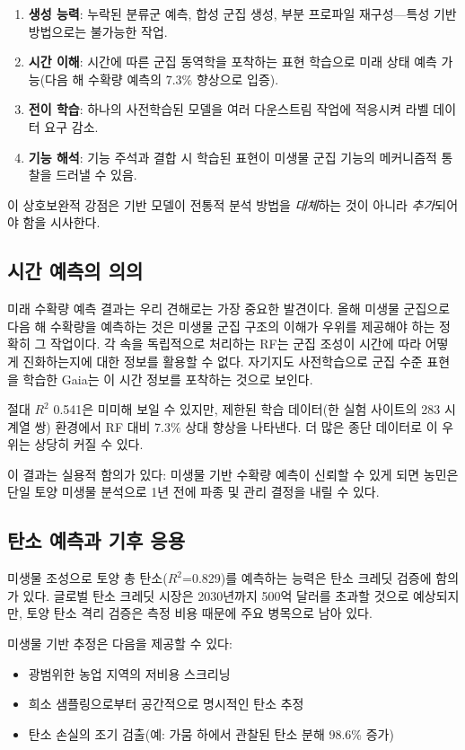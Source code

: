 \documentclass[11pt,a4paper]{article}
\begin{document}
\begin{enumerate}[leftmargin=1.5em]
    \item \textbf{생성 능력}: 누락된 분류군 예측, 합성 군집 생성, 부분 프로파일 재구성---특성 기반 방법으로는 불가능한 작업.
    \item \textbf{시간 이해}: 시간에 따른 군집 동역학을 포착하는 표현 학습으로 미래 상태 예측 가능(다음 해 수확량 예측의 7.3\% 향상으로 입증).
    \item \textbf{전이 학습}: 하나의 사전학습된 모델을 여러 다운스트림 작업에 적응시켜 라벨 데이터 요구 감소.
    \item \textbf{기능 해석}: 기능 주석과 결합 시 학습된 표현이 미생물 군집 기능의 메커니즘적 통찰을 드러낼 수 있음.
\end{enumerate}

이 상호보완적 강점은 기반 모델이 전통적 분석 방법을 \emph{대체}하는 것이 아니라 \emph{추가}되어야 함을 시사한다.

\subsection{시간 예측의 의의}

미래 수확량 예측 결과는 우리 견해로는 가장 중요한 발견이다. 올해 미생물 군집으로 다음 해 수확량을 예측하는 것은 미생물 군집 구조의 이해가 우위를 제공해야 하는 정확히 그 작업이다. 각 속을 독립적으로 처리하는 RF는 군집 조성이 시간에 따라 어떻게 진화하는지에 대한 정보를 활용할 수 없다. 자기지도 사전학습으로 군집 수준 표현을 학습한 Gaia는 이 시간 정보를 포착하는 것으로 보인다.

절대 $R^2$ 0.541은 미미해 보일 수 있지만, 제한된 학습 데이터(한 실험 사이트의 283 시계열 쌍) 환경에서 RF 대비 7.3\% 상대 향상을 나타낸다. 더 많은 종단 데이터로 이 우위는 상당히 커질 수 있다.

이 결과는 실용적 함의가 있다: 미생물 기반 수확량 예측이 신뢰할 수 있게 되면 농민은 단일 토양 미생물 분석으로 1년 전에 파종 및 관리 결정을 내릴 수 있다.

\subsection{탄소 예측과 기후 응용}

미생물 조성으로 토양 총 탄소($R^2$=0.829)를 예측하는 능력은 탄소 크레딧 검증에 함의가 있다. 글로벌 탄소 크레딧 시장은 2030년까지 500억 달러를 초과할 것으로 예상되지만, 토양 탄소 격리 검증은 측정 비용 때문에 주요 병목으로 남아 있다.

미생물 기반 추정은 다음을 제공할 수 있다:
\begin{itemize}[leftmargin=1.5em]
    \item 광범위한 농업 지역의 저비용 스크리닝
    \item 희소 샘플링으로부터 공간적으로 명시적인 탄소 추정
    \item 탄소 손실의 조기 검출(예: 가뭄 하에서 관찰된 탄소 분해 98.6\% 증가)
\end{itemize}
\end{document}
